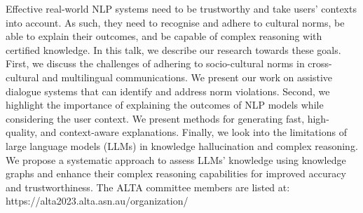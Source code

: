 Effective real-world NLP systems need to be trustworthy and take users’ contexts into account. As such, they need to recognise and adhere to cultural norms, be able to explain their outcomes, and be capable of complex reasoning with certified knowledge. In this talk, we describe our research towards these goals. First, we discuss the challenges of adhering to socio-cultural norms in cross-cultural and multilingual communications. We present our work on assistive dialogue systems that can identify and address norm violations. Second, we highlight the importance of explaining the outcomes of NLP models while considering the user context. We present methods for generating fast, high-quality, and context-aware explanations. Finally, we look into the limitations of large language models (LLMs) in knowledge hallucination and complex reasoning. We propose a systematic approach to assess LLMs’ knowledge using knowledge graphs and enhance their complex reasoning capabilities for improved accuracy and trustworthiness.
The ALTA committee members are listed at:
https://alta2023.alta.asn.au/organization/
